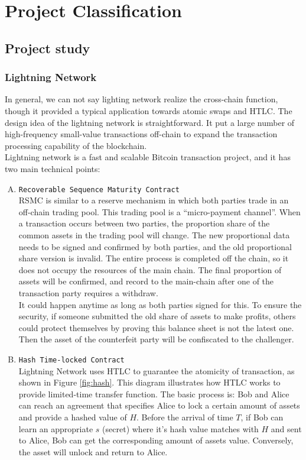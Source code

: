 \chapter{Project Classification} 
\label{chap:3}


\section{Project study}
\label{sec:ps}

\subsection{Lightning Network}
\noindent In general, we can not say lighting network realize the cross-chain function, though it provided a typical application towards atomic swaps and HTLC. The design idea of the lightning network is straightforward. It put a large number of high-frequency small-value transactions off-chain to expand the transaction processing capability of the blockchain.\\
\noindent Lightning network\cite{poon2016bitcoin} is a fast and scalable Bitcoin transaction project, and it has two main technical points:
\begin{enumerate}[A.]
    \item \texttt{Recoverable Sequence Maturity Contract} \\
    RSMC is similar to a reserve mechanism in which both parties trade in an off-chain trading pool.  This trading pool is a ``micro-payment channel''. When a transaction occurs between two parties, the proportion share of the common assets in the trading pool will change. The new proportional data needs to be signed and confirmed by both parties, and the old proportional share version is invalid. The entire process is completed off the chain, so it does not occupy the resources of the main chain. The final proportion of assets will be confirmed, and record to the main-chain after one of the transaction party requires a withdraw.\\
    It could happen anytime as long as both parties signed for this. To ensure the security, if someone submitted the old share of assets to make profits, others could protect themselves by proving this balance sheet is not the latest one. Then the asset of the counterfeit party will be confiscated to the challenger.
    \item \texttt{Hash Time-locked Contract}\\
     Lightning Network uses HTLC to guarantee the atomicity of transaction, as shown in Figure \ref{fig:hash}. This diagram illustrates how HTLC works to provide limited-time transfer function. The basic process is: Bob and Alice can reach an agreement that specifies Alice to lock a certain amount of assets and provide a hashed value of $H$. Before the arrival of time $T$, if Bob can learn an appropriate $s$ (secret) where it's hash value matches with $H$ and sent to Alice, Bob can get the corresponding amount of assets value. Conversely, the asset will unlock and return to Alice.
\end{enumerate}
